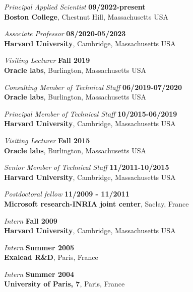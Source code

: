\documentclass[margin,line]{res}
\begin{document}
\begin{resume}
{\em Principal Applied Scientist} \hfill {\bf 09/2022-present}\\
{\bf Boston College}, Chestnut Hill, Massachusetts USA
\vspace{-.4cm}

{\em Associate Professor} \hfill {\bf 08/2020-05/2023}\\
{\bf Harvard University}, Cambridge, Massachusetts USA
\vspace{-.4cm}

{\em Visiting Lecturer} \hfill {\bf Fall 2019}\\
{\bf Oracle labs}, Burlington, Massachusetts USA
\vspace{-.4cm}

{\em Consulting Member of Technical Staff} \hfill {\bf 06/2019-07/2020}\\
{\bf Oracle labs}, Burlington, Massachusetts USA
\vspace{-.4cm}

{\em Principal Member of Technical Staff} \hfill {\bf 10/2015-06/2019}\\
{\bf Harvard University}, Cambridge, Massachusetts USA
\vspace{-.4cm}

{\em Visiting Lecturer} \hfill {\bf Fall 2015}\\
{\bf Oracle labs}, Burlington, Massachusetts USA
\vspace{-.4cm}

{\em Senior Member of Technical Staff} \hfill {\bf 11/2011-10/2015}\\
       {\bf Harvard University}, Cambridge, Massachusetts USA
\vspace{-.4cm}

{\em Postdoctoral fellow} \hfill {\bf 11/2009 - 11/2011}\\
{\bf Microsoft research-INRIA joint center}, Saclay, France
\vspace{-.4cm}

{\em Intern} \hfill {\bf Fall 2009}\\
{\bf Harvard University}, Cambridge, Massachusetts USA

\vspace{-.4cm}
{\em Intern} \hfill {\bf Summer 2005}\\
{\bf Exalead R\&D}, Paris, France

\vspace{-.4cm}
{\em Intern} \hfill {\bf Summer 2004}\\
{\bf University of Paris, 7}, Paris, France


\end{resume}
\end{document}

